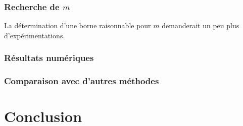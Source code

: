 \documentclass[a4paper]{article} %
\numberwithin{section}{part}
\numberwithin{equation}{section}
\begin{document}
\section{Recherche de $m$}
La détermination d'une borne raisonnable pour $m$ demanderait un peu plus
d'expérimentations.

\section{Résultats numériques}

\section{Comparaison avec d'autres méthodes}

\part{Conclusion}
\label{quatre}
\end{document}
